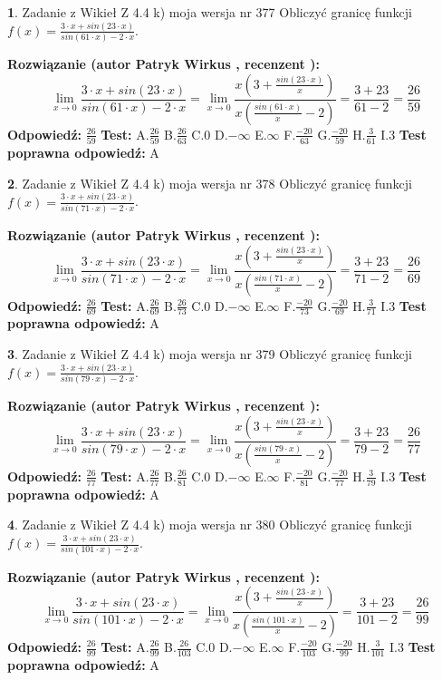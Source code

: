 \documentclass[12pt, a4paper]{article}
\theoremstyle{definition} %
\newtheorem{zad}{}
\newcommand{\zadStart}[1]{\begin{zad}#1\newline}
\newcommand{\zadStop}{\end{zad}}
\newcommand{\rozwStart}[2]{\noindent \textbf{Rozwiązanie (autor #1 , recenzent #2): }\newline}
\newcommand{\rozwStop}{\newline}
\newcommand{\odpStart}{\noindent \textbf{Odpowiedź:}\newline}
\newcommand{\odpStop}{\newline}
\newcommand{\testStart}{\noindent \textbf{Test:}\newline}
\newcommand{\testStop}{\newline}
\newcommand{\kluczStart}{\noindent \textbf{Test poprawna odpowiedź:}\newline}
\newcommand{\kluczStop}{\newline}
\begin{document}
\zadStart{Zadanie z Wikieł Z 4.4 k) moja wersja nr 377}
Obliczyć granicę funkcji $f(x)=\frac{3\cdot x +sin(23\cdot x)}{sin(61\cdot x) -2\cdot x}$.
\zadStop
\rozwStart{Patryk Wirkus}{}
$$\lim\limits_{x\to 0}\frac{3\cdot x +sin(23\cdot x)}{sin(61\cdot x) -2\cdot x}
=\lim\limits_{x\to 0}\frac{x(3+\frac{sin(23\cdot x)}{x})}{x(\frac{sin(61\cdot x)}{x}-2)}
=\frac{3+23}{61-2} = \frac{26}{59}$$
\rozwStop
\odpStart
$\frac{26}{59}$
\odpStop
\testStart
A.$\frac{26}{59}$
B.$\frac{26}{63}$
C.$0$
D.$-\infty$
E.$\infty$
F.$\frac{-20}{63}$
G.$\frac{-20}{59}$
H.$\frac{3}{61}$
I.$3$
\testStop
\kluczStart
A
\kluczStop



\zadStart{Zadanie z Wikieł Z 4.4 k) moja wersja nr 378}
Obliczyć granicę funkcji $f(x)=\frac{3\cdot x +sin(23\cdot x)}{sin(71\cdot x) -2\cdot x}$.
\zadStop
\rozwStart{Patryk Wirkus}{}
$$\lim\limits_{x\to 0}\frac{3\cdot x +sin(23\cdot x)}{sin(71\cdot x) -2\cdot x}
=\lim\limits_{x\to 0}\frac{x(3+\frac{sin(23\cdot x)}{x})}{x(\frac{sin(71\cdot x)}{x}-2)}
=\frac{3+23}{71-2} = \frac{26}{69}$$
\rozwStop
\odpStart
$\frac{26}{69}$
\odpStop
\testStart
A.$\frac{26}{69}$
B.$\frac{26}{73}$
C.$0$
D.$-\infty$
E.$\infty$
F.$\frac{-20}{73}$
G.$\frac{-20}{69}$
H.$\frac{3}{71}$
I.$3$
\testStop
\kluczStart
A
\kluczStop



\zadStart{Zadanie z Wikieł Z 4.4 k) moja wersja nr 379}
Obliczyć granicę funkcji $f(x)=\frac{3\cdot x +sin(23\cdot x)}{sin(79\cdot x) -2\cdot x}$.
\zadStop
\rozwStart{Patryk Wirkus}{}
$$\lim\limits_{x\to 0}\frac{3\cdot x +sin(23\cdot x)}{sin(79\cdot x) -2\cdot x}
=\lim\limits_{x\to 0}\frac{x(3+\frac{sin(23\cdot x)}{x})}{x(\frac{sin(79\cdot x)}{x}-2)}
=\frac{3+23}{79-2} = \frac{26}{77}$$
\rozwStop
\odpStart
$\frac{26}{77}$
\odpStop
\testStart
A.$\frac{26}{77}$
B.$\frac{26}{81}$
C.$0$
D.$-\infty$
E.$\infty$
F.$\frac{-20}{81}$
G.$\frac{-20}{77}$
H.$\frac{3}{79}$
I.$3$
\testStop
\kluczStart
A
\kluczStop



\zadStart{Zadanie z Wikieł Z 4.4 k) moja wersja nr 380}
Obliczyć granicę funkcji $f(x)=\frac{3\cdot x +sin(23\cdot x)}{sin(101\cdot x) -2\cdot x}$.
\zadStop
\rozwStart{Patryk Wirkus}{}
$$\lim\limits_{x\to 0}\frac{3\cdot x +sin(23\cdot x)}{sin(101\cdot x) -2\cdot x}
=\lim\limits_{x\to 0}\frac{x(3+\frac{sin(23\cdot x)}{x})}{x(\frac{sin(101\cdot x)}{x}-2)}
=\frac{3+23}{101-2} = \frac{26}{99}$$
\rozwStop
\odpStart
$\frac{26}{99}$
\odpStop
\testStart
A.$\frac{26}{99}$
B.$\frac{26}{103}$
C.$0$
D.$-\infty$
E.$\infty$
F.$\frac{-20}{103}$
G.$\frac{-20}{99}$
H.$\frac{3}{101}$
I.$3$
\testStop
\kluczStart
A
\kluczStop
\end{document}
